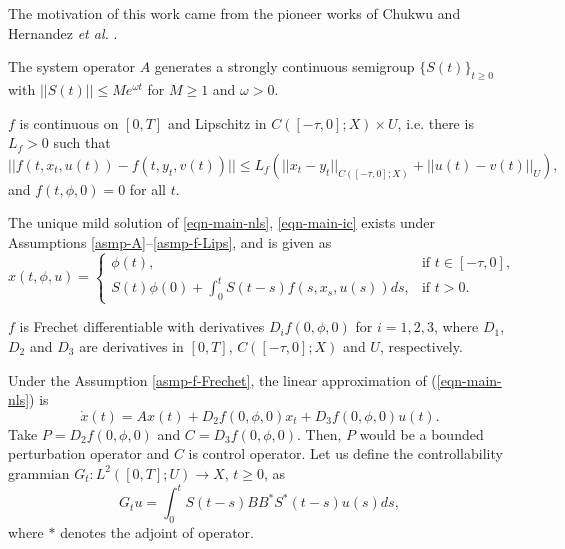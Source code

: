 \documentclass[12pt]{llncs}
\begin{document}
The motivation of this work came from the pioneer works of Chukwu \cite{Chukwu91delay} and Hernandez \emph{et al.} \cite{hernandez2020alka}.

\begin{asmp}\label{asmp-A}
The system operator $A$ generates a strongly continuous semigroup $\{S(t)\}_{t \ge 0}$ with $||S(t)|| \le M e^{\omega t}$ for $M \ge 1$ and $\omega > 0$.
\end{asmp}

\begin{asmp}\label{asmp-f-Lips}
$f$ is continuous on $[0,T]$ and Lipschitz in $C([-\tau,0];X) \times U$, i.e. there is $L_f > 0$ such that
        \begin{equation*}
          ||f(t,x_t,u(t)) - f(t,y_t,v(t))|| \le L_f (||x_t - y_t||_{C([-\tau,0];X)} + ||u(t) - v(t)||_U),
        \end{equation*}
                and $f(t,\phi,0)=0$ for all $t$.
\end{asmp}

The unique mild solution of \eqref{eqn-main-nls}, \eqref{eqn-main-ic} exists under Assumptions \ref{asmp-A}--\ref{asmp-f-Lips}, and is given as
\begin{equation*}
x(t,\phi,u) = \begin{cases}
                \phi(t), & \mbox{if } t \in [-\tau,0], \\
                S(t)\phi(0) + \int_{0}^{t} S(t-s) f(s,x_s,u(s))ds , & \mbox{if } t > 0.
              \end{cases}
\end{equation*}

\begin{asmp}\label{asmp-f-Frechet}
$f$ is Frechet differentiable %
with derivatives $D_i f(0,\phi,0)$ for $i = 1,2,3$, where $D_1$, $D_2$ and $D_3$ are derivatives in $[0,T]$, $C([-\tau,0];X)$ and $U$, respectively.
\end{asmp}

Under the Assumption \ref{asmp-f-Frechet}, the linear approximation of (\ref{eqn-main-nls}) is
\begin{equation}\label{eqn-lin-approx}
\dot{x}(t) = A x(t) + D_2 f(0,\phi,0)x_t + D_3 f(0,\phi,0)u(t).
\end{equation}
Take $P = D_2 f(0,\phi,0)$ and $C = D_3 f(0,\phi,0)$. Then, $P$ would be a bounded perturbation operator and $C$ is control operator. Let us define the controllability grammian $G_t : L^2([0,T];U) \rightarrow X$, $t \ge 0$, as
\begin{equation}\label{eqn-cg-dfn}
G_t u = \int_{0}^{t} S(t-s) B B^* S^*(t-s)u(s)ds,
\end{equation}
where $*$ denotes the adjoint of operator.
\end{document}
